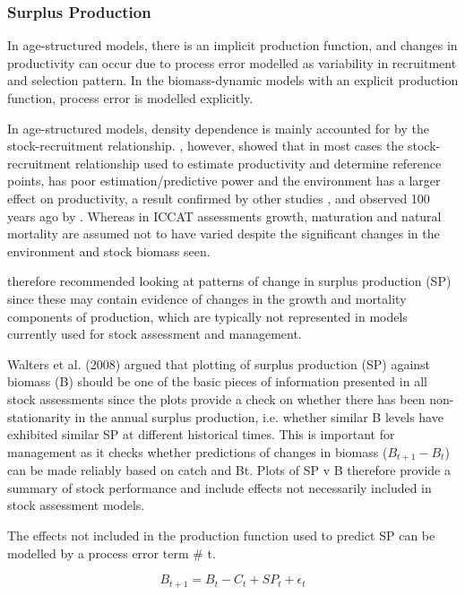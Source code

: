 \subsubsection*{Surplus Production}

In age-structured models, there is an implicit production function, and changes in productivity can occur due to process error modelled as variability in recruitment and selection pattern. In the biomass-dynamic models with an explicit production function, process error is modelled explicitly.

In age-structured models, density dependence is mainly accounted for by the stock-recruitment relationship. \cite{cury2014resolving}, however, showed that in most cases the stock-recruitment relationship used to estimate productivity and determine reference points, has poor estimation/predictive power and the environment has a larger effect on productivity, a result confirmed by other studies \citep[e.g][]{szuwalski2015examining}, and observed 100 years ago by \cite{hjort1914fluctuations}. Whereas in ICCAT assessments growth, maturation and natural mortality are assumed not to have varied despite the significant changes in the environment and stock biomass seen.

\cite{hilborn2001calculation} therefore recommended looking at patterns of change in surplus production (SP) since these may contain evidence of changes in the growth and mortality components of production, which are typically not represented in models currently used for stock assessment and management. 

Walters et al. (2008) argued that plotting of surplus production (SP) against biomass (B) should be one of the basic pieces of information presented in all stock assessments since the plots provide a check on whether there has been non-stationarity in the annual surplus production, i.e. whether similar B levels have exhibited similar SP at different historical times. This is important for management as it checks whether predictions of changes in biomass ($B_{t+1}−B_t$) can be made reliably based on catch and Bt. Plots of SP v B therefore provide a summary of stock performance and include effects not necessarily included in stock assessment models.

The effects not included in the production function used to predict SP can be modelled by a process error term # t.

\begin{equation} 
B_{t+1} = B_t − C_t + SP_t + \epsilon_t
\end{equation}

